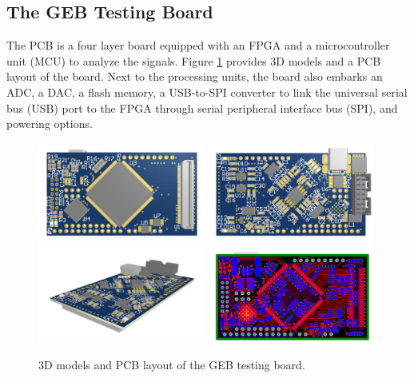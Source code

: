    \subsection{The GEB Testing Board}

      The PCB is a four layer board equipped with an FPGA and a microcontroller unit (MCU) to analyze the signals. Figure \ref{fig:II-4-geb-pcb} provides 3D models and a PCB layout of the board. Next to the processing units, the board also embarks an ADC, a DAC, a flash memory, a USB-to-SPI converter to link the universal serial bus (USB) port to the FPGA through serial peripheral interface bus (SPI), and powering options.

      \begin{figure}[h!]
        \centering
        \includegraphics[width=0.49\textwidth]{img/II-4-qualification/geb-3d-0.png}
        \includegraphics[width=0.49\textwidth]{img/II-4-qualification/geb-3d-1.png}
        \vspace*{0.3cm}
        \includegraphics[width=0.49\textwidth]{img/II-4-qualification/geb-3d-2.png}
        \includegraphics[width=0.49\textwidth]{img/II-4-qualification/geb-pcb.png}
        \caption{3D models and PCB layout of the GEB testing board.}
        \label{fig:II-4-geb-pcb}
      \end{figure}

